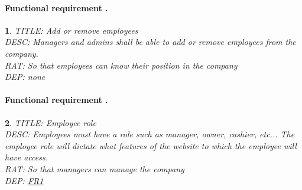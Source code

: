\documentclass{scrreprt}
\theoremstyle{funreq}
\newtheorem{funreq}{}
\newcommand*{\reqref}[1]{\hyperref[#1]{FR\ref*{#1}}}
\begin{document}
	\paragraph[]{Functional requirement .}
	\begin{funreq}
		\label{employee_addremove}
		TITLE: Add or remove employees\\
		DESC: Managers and admins shall be able to add or remove employees from the company.  \\
		RAT: So that employees can know their position in the company\\
		DEP: none
	\end{funreq}
	
	\paragraph[]{Functional requirement .}
	\begin{funreq}
		\label{employee_role}
		TITLE: Employee role\\
		DESC: Employees must have a role such as manager, owner, cashier, etc...  The employee role will dictate what features of the website to which the employee will have access.\\
		RAT: So that managers can manage the company\\
		DEP: \reqref{employee_addremove}
	\end{funreq}
\end{document}
